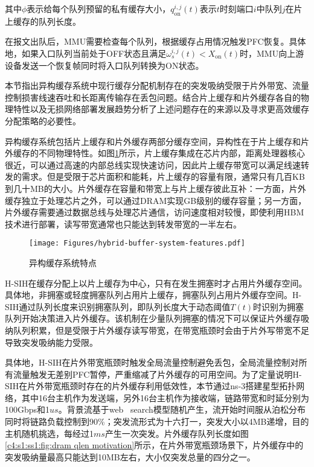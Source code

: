 \noindent 其中$\phi$表示给每个队列预留的私有缓存大小，$q^{i,j}_{\text{on}}(t)$表示$t$时刻端口$i$中队列$j$在片上缓存的队列长度。

在报文出队后，MMU需要检查每个队列，根据缓存占用情况触发PFC恢复。具体地，如果入口队列当前处于OFF状态且满足$\omega_{s}^{i,j}(t)<X_{\text{on}}(t)$时，MMU向上游设备发送一个恢复帧同时将入口队列转换为ON状态。

\label{c4:s2:problem analysis}

本节指出异构缓存系统中现行缓存分配机制存在的突发吸纳受限于片外带宽、流量控制损害线速吞吐和长距离传输存在丢包问题。结合片上缓存和片外缓存各自的物理特性以及无损网络部署发展趋势分析了上述问题存在的来源以及寻求更高效缓存分配策略的必要性。


异构缓存系统包括片上缓存和片外缓存两部分缓存空间，异构性在于片上缓存和片外缓存的不同物理特性。如图\ref{c4:s1:ss1:fig:hybrid buffer system features}所示，片上缓存集成在芯片内部，距离处理器核心很近，可以通过高速的内部总线实现快速访问，因此片上缓存带宽可以满足线速转发的需求。但是受限于芯片面积和能耗，片上缓存的容量有限，通常只有几百KB到几十MB的大小。片外缓存在容量和带宽上与片上缓存彼此互补：一方面，片外缓存独立于处理芯片之外，可以通过DRAM实现GB级别的缓存容量；另一方面，片外缓存需要通过数据总线与处理芯片通信，访问速度相对较慢，即使利用HBM技术\cite{jedecHBM2E,kim2019design}进行部署，读写带宽通常也只能达到转发带宽的一半左右\cite{Ciscohybridbuffer,}。

\begin{figure}[H]
  \centering
  \texttt{[image: Figures/hybrid-buffer-system-features.pdf]}
  \caption{异构缓存系统特点}
  \label{c4:s1:ss1:fig:hybrid buffer system features}
\end{figure}

H-SIH在缓存分配上以片上缓存为中心，只有在发生拥塞时才占用片外缓存空间。具体地，非拥塞或轻度拥塞队列占用片上缓存，拥塞队列占用片外缓存空间。H-SIH通过队列长度来识别拥塞队列，即队列长度大于动态阈值$T(t)$时识别为拥塞队列开始决策进入片外缓存。该机制在少量队列拥塞的情况下可以保证片外缓存吸纳队列积累，但是受限于片外缓存读写带宽，在带宽瓶颈时会由于片外写带宽不足导致突发吸纳能力受限。

具体地，H-SIH在片外带宽瓶颈时触发全局流量控制避免丢包，全局流量控制对所有流量触发无差别PFC暂停，严重缩减了片外缓存的可用空间。为了定量说明H-SIH在片外带宽瓶颈时存在的片外缓存利用低效性，本节通过ns-3搭建星型拓扑网络，其中16台主机作为发送端，另外16台主机作为接收端，链路带宽和时延分别为100Gbps和1$us$。背景流基于web \ search\cite{SIGCOMM10DCTCP}模型随机产生，流开始时间服从泊松分布同时将链路负载控制到90\%；突发流形式为十六打一，突发大小以4MB递增，目的主机随机挑选，每经过1$ms$产生一次突发。片外缓存队列长度如图\ref{c4:s1:ss1:fig:dram qlen motivation}所示，在片外带宽瓶颈场景下，片外缓存中的突发吸纳量最高只能达到10MB左右，大小仅突发总量的四分之一。

